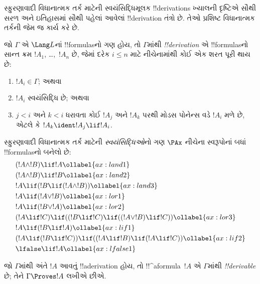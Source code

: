 \documentclass[../../../include/open-logic-section]{subfiles}
\begin{document}


સ્ફુરણાવાદી વિધાનાત્મક તર્ક માટેની સ્વયંસિદ્ધિમૂલક
!!{derivation}s ખ્યાલની દૃષ્ટિએ સૌથી સરળ અને ઇતિહાસમાં
સૌથી પહેલાં આવેલાં !!{derivation} તંત્રો છે. તેઓ પ્રશિષ્ટ
વિધાનાત્મક તર્કની જેમ જ કાર્ય કરે છે.

\begin{defn}[!!^{derivability}]
જો $\Gamma$ એ $\Lang L$નાં !!{formula}sનો ગણ હોય, તો
$\Gamma$માંથી \emph{!!{derivation}} એ !!{formula}sનો
સાન્ત ક્રમ $!A_1$, \dots,~$!A_n$ છે, જેમાં દરેક $i \le n$
માટે નીચેનામાંથી કોઈ એક શરત પૂરી થાય છે:
\begin{enumerate}
\item $!A_i \in \Gamma$; અથવા
\item $!A_i$ સ્વયંસિદ્ધિ છે; અથવા
\item $j < i$ અને $k < i$ ધરાવતા કોઈ $!A_j$ અને $!A_k$
  પરથી મોડસ પોનેન્સ વડે $!A_i$ મળે છે, એટલે કે
  $!A_k \ident !A_j \lif !A_i$.
\end{enumerate}
\end{defn}

\begin{defn}[સ્વયંસિદ્ધિઓ]
સ્ફુરણાવાદી વિધાનાત્મક તર્ક માટેની \emph{સ્વયંસિદ્ધિઓ}નો ગણ
$\PAx$ નીચેના સ્વરૂપોનાં બધાં !!{formula}sનો બનેલો છે:
\begin{align}
  & (!A \land !B) \lif !A \ollabel{ax:land1}\\
  & (!A \land !B) \lif !B \ollabel{ax:land2}\\
  & !A \lif (!B \lif (!A \land !B)) \ollabel{ax:land3}\\
  & !A \lif (!A \lor !B) \ollabel{ax:lor1}\\
  & !A \lif (!B \lor !A) \ollabel{ax:lor2}\\
  & (!A \lif !C) \lif ((!B \lif !C) \lif ((!A \lor !B) \lif !C)) \ollabel{ax:lor3}\\
  & !A \lif (!B \lif !A) \ollabel{ax:lif1}\\
  & (!A \lif (!B \lif !C)) \lif ((!A \lif !B) \lif (!A \lif !C)) \ollabel{ax:lif2}\\
  & \lfalse \lif !A \ollabel{ax:lfalse1}
\end{align}
\end{defn}

\begin{defn}[!!^{derivability}]
જો $\Gamma$માંથી અંતે $!A$ આવતું !!a{derivation} હોય, તો
!!^a{formula}~$!A$ એ $\Gamma$માંથી \emph{!!{derivable}}
છે; તેને $\Gamma \Proves !A$ લખીએ છીએ.
\end{defn}
\end{document}
